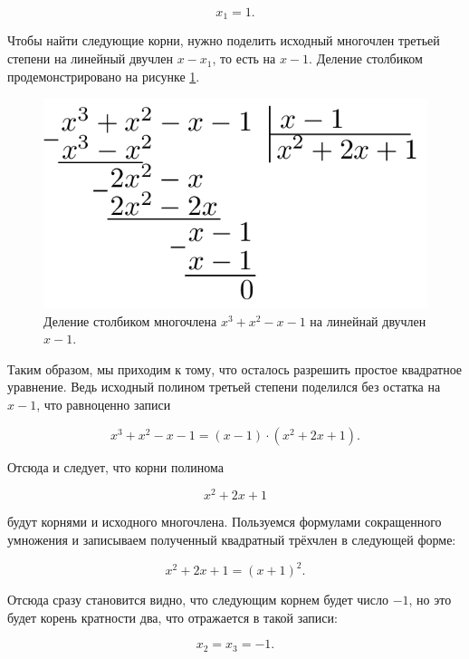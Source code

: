 \documentclass[12pt]{article}
\begin{document}
\begin{equation}
 	x_1 = 1.
 \end{equation} 

Чтобы найти следующие корни, нужно поделить исходный многочлен третьей степени на линейный двучлен $x-x_1$, то есть на $x-1$. Деление столбиком продемонстрировано на рисунке \ref{fig:72}.

\begin{figure}[htbp]
	\centering
	\includegraphics[width=\linewidth]{fig7}
	\caption{Деление столбиком многочлена $x^3+x^2-x-1$ на линейнай двучлен $x-1$.}
	\label{fig:72}
\end{figure}

Таким образом, мы приходим к тому, что осталось разрешить простое квадратное уравнение. Ведь исходный полином третьей степени поделился без остатка на $x-1$, что равноценно записи

\begin{equation}
	x^3+x^2-x-1 = (x-1)\cdot(x^2+2x+1).
\end{equation}

Отсюда и следует, что корни полинома

\begin{equation}
	x^2 + 2x +1
\end{equation}

будут корнями и исходного многочлена. Пользуемся формулами сокращенного умножения и записываем полученный квадратный трёхчлен в следующей форме:

\begin{equation}
	x^2 + 2x +1 = (x+1)^2.
\end{equation}

Отсюда сразу становится видно, что следующим корнем будет число $-1$, но это будет корень кратности два, что отражается в такой записи:

\begin{equation}
	x_2 = x_3 = -1.
\end{equation}
\end{document}
